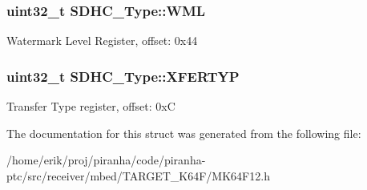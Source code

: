 \subsubsection[{\texorpdfstring{W\+ML}{WML}}]{ uint32\+\_\+t S\+D\+H\+C\+\_\+\+Type\+::\+W\+ML}\hypertarget{structSDHC__Type_a61dd6c881db2eb748aaed392578869c7}{}\label{structSDHC__Type_a61dd6c881db2eb748aaed392578869c7}
Watermark Level Register, offset\+: 0x44 
\subsubsection[{\texorpdfstring{X\+F\+E\+R\+T\+YP}{XFERTYP}}]{ uint32\+\_\+t S\+D\+H\+C\+\_\+\+Type\+::\+X\+F\+E\+R\+T\+YP}\hypertarget{structSDHC__Type_aaf15f447a947396dffb6b71383e99170}{}\label{structSDHC__Type_aaf15f447a947396dffb6b71383e99170}
Transfer Type register, offset\+: 0xC 

The documentation for this struct was generated from the following file\+:\begin{DoxyCompactItemize}
\item 
/home/erik/proj/piranha/code/piranha-\/ptc/src/receiver/mbed/\+T\+A\+R\+G\+E\+T\+\_\+\+K64\+F/M\+K64\+F12.\+h\end{DoxyCompactItemize}
